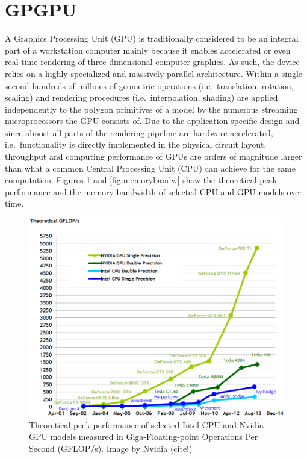 \section{GPGPU}
A Graphics Processing Unit (GPU) is traditionally considered to be an integral part of a workstation computer mainly because it enables accelerated or even real-time rendering of three-dimensional computer graphics. As such, the device relies on a highly specialized and massively parallel architecture. Within a single second hundreds of millions of geometric operations (i.e.\ translation, rotation, scaling) and rendering procedures (i.e.\ interpolation, shading) are applied independently to the polygon primitives of a model by the numerous streaming microprocessors the GPU consists of. Due to the application specific design and since almost all parts of the rendering pipeline are hardware-accelerated, i.e.\ functionality is directly implemented in the physical circuit layout, throughput and computing performance of GPUs are orders of magnitude larger than what a common Central Processing Unit (CPU) can achieve for the same computation. Figures \ref{fig:peakperf} and \ref{fig:memorybandw} show the theoretical peak performance and the memory-bandwidth of selected CPU and GPU models over time. 

\begin{figure}
\centering
\includegraphics[width=\textwidth, trim = 0mm 0mm 0mm 10mm, clip]{images/floating-point-operations-per-second.png}
\caption{Theoretical peek performance of selected Intel CPU and Nvidia GPU models measured in Giga-Floating-point Operations Per Second (GFLOP/s). Image by Nvidia (cite!)}
\label{fig:peakperf}
\end{figure}

